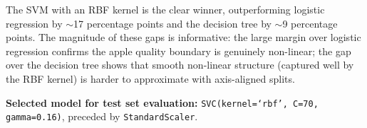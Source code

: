 \documentclass[11pt]{article}
\begin{document}
The SVM with an RBF kernel is the clear winner, outperforming logistic regression by $\sim$17 percentage points and the decision tree by $\sim$9 percentage points.
The magnitude of these gaps is informative: the large margin over logistic regression confirms the apple quality boundary is genuinely non-linear; the gap over the decision tree shows that smooth non-linear structure (captured well by the RBF kernel) is harder to approximate with axis-aligned splits.



\textbf{Selected model for test set evaluation:} \texttt{SVC(kernel=`rbf', C=70, gamma=0.16)}, preceded by \texttt{StandardScaler}.
\end{document}
